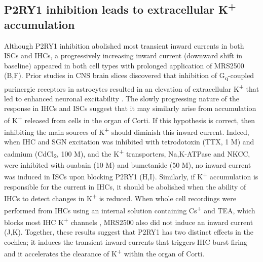 \documentclass[9pt,lineno]{elife}
\begin{document}
\subsection{P2RY1 inhibition leads to extracellular K\textsuperscript{+} accumulation}
Although P2RY1 inhibition abolished most transient inward currents in both ISCs and IHCs, a progressively increasing inward current (downward shift in baseline) appeared in both cell types with prolonged application of MRS2500 (B,F). Prior studies in CNS brain slices discovered that inhibition of G\textsubscript{q}-coupled purinergic receptors in astrocytes resulted in an elevation of extracellular K\textsuperscript{+} that led to enhanced neuronal excitability \citep{Wang2012}. The slowly progressing nature of the response in IHCs and ISCs suggest that it may similarly arise from accumulation of K\textsuperscript{+} released from cells in the organ of Corti. If this hypothesis is correct, then inhibiting the main sources of K\textsuperscript{+} should diminish this inward current. Indeed, when IHC and SGN excitation was inhibited with tetrodotoxin (TTX, 1 \textmu M) and cadmium (CdCl\textsubscript{2}, 100 \textmu M), and the K\textsuperscript{+} transporters, Na,K-ATPase and NKCC, were inhibited with ouabain (10 \textmu M) and bumetanide (50 \textmu M), no inward current was induced in ISCs upon blocking P2RY1 (H,I). Similarly, if K\textsuperscript{+} accumulation is responsible for the current in IHCs, it should be abolished when the ability of IHCs to detect changes in K\textsuperscript{+} is reduced. When whole cell recordings were performed from IHCs using an internal solution containing Cs\textsuperscript{+} and TEA, which blocks most IHC K\textsuperscript{+} channels \citep{kros1998expression,marcotti2003developmental}, MRS2500 also did not induce an inward current (J,K). Together, these results suggest that P2RY1 has two distinct effects in the cochlea; it induces the transient inward currents that triggers IHC burst firing and it accelerates the clearance of K\textsuperscript{+} within the organ of Corti.
\end{document}
